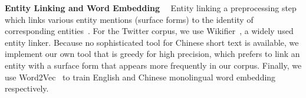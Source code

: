 \textbf{Entity Linking and Word Embedding}~~
Entity linking a preprocessing step which links various entity mentions (surface forms) to the identity of corresponding entities~\cite{Ren2017CoTypeJE,Pan2017CrosslingualNT}. 
For the Twitter corpus, we use Wikifier~\cite{cheng2013relational,ratinov2011local}, a widely used
entity linker. 
Because no sophisticated tool for Chinese short text is available, 
we implement our own tool that is greedy for high precision, which prefers to link an entity with a surface form that appears more frequently in our corpus. 
%
%
Finally, we use Word2Vec~\cite{Mikolov2013distributed} to train English and Chinese monolingual word embedding respectively.

